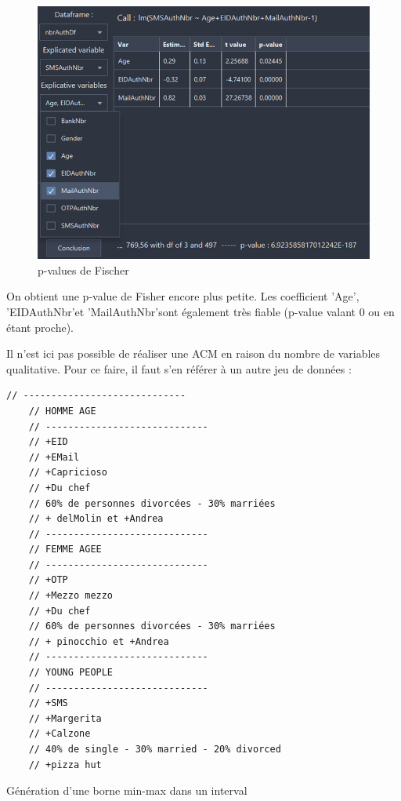 \begin{figure}[H]
    \centering
    \includegraphics[width=\textwidth]{./img/thibault-Tests_Exemple_3.png}
    \caption{p-values de Fischer}
    \label{fig:thibault-ex-03}
\end{figure}

On obtient une p-value de Fisher encore plus petite. Les coefficient 'Age', 'EIDAuthNbr'et
'MailAuthNbr'sont également très fiable (p-value valant 0 ou en étant proche).

Il n'est ici pas possible de réaliser une ACM en raison du nombre de variables qualitative. Pour ce
faire, il faut s'en référer à un autre jeu de données :

\begin{listing}[H]
    \begin{verbatim}
// -----------------------------
    // HOMME AGE
    // -----------------------------
    // +EID
    // +EMail
    // +Capricioso
    // +Du chef
    // 60% de personnes divorcées - 30% marriées
    // + delMolin et +Andrea
    // -----------------------------
    // FEMME AGEE
    // -----------------------------
    // +OTP
    // +Mezzo mezzo
    // +Du chef
    // 60% de personnes divorcées - 30% marriées
    // + pinocchio et +Andrea
    // -----------------------------
    // YOUNG PEOPLE
    // -----------------------------
    // +SMS
    // +Margerita
    // +Calzone
    // 40% de single - 30% married - 20% divorced
    // +pizza hut
    \end{verbatim}
    \caption{Génération d'une borne min-max dans un interval}
    \label{listing:thibault-another-data-set}
\end{listing}

